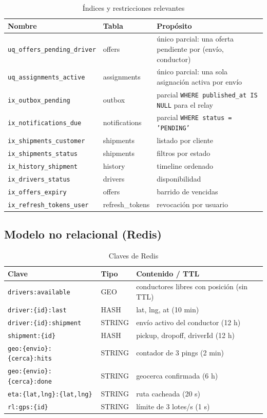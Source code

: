 \documentclass[conference]{IEEEtran}
\newcommand{\pkg}[1]{\texttt{#1}}
\begin{document}
\begin{table}[t]
\centering
\caption{Índices y restricciones relevantes}
\small
\begin{tabular}{@{}L{4.6cm}L{2.4cm}L{7.4cm}@{}}
\toprule
\textbf{Nombre} & \textbf{Tabla} & \textbf{Propósito}\\
\midrule
\pkg{uq\_offers\_pending\_driver} & offers & único parcial: una oferta pendiente por (envío, conductor)\\
\pkg{uq\_assignments\_active} & assignments & único parcial: una sola asignación activa por envío\\
\pkg{ix\_outbox\_pending} & outbox & parcial \pkg{WHERE published\_at IS NULL} para el relay\\
\pkg{ix\_notifications\_due} & notifications & parcial \pkg{WHERE status = 'PENDING'}\\
\pkg{ix\_shipments\_customer} & shipments & listado por cliente\\
\pkg{ix\_shipments\_status} & shipments & filtros por estado\\
\pkg{ix\_history\_shipment} & history & timeline ordenado\\
\pkg{ix\_drivers\_status} & drivers & disponibilidad\\
\pkg{ix\_offers\_expiry} & offers & barrido de vencidas\\
\pkg{ix\_refresh\_tokens\_user} & refresh\_tokens & revocación por usuario\\
\bottomrule
\end{tabular}
\end{table}

\subsection{Modelo no relacional (Redis)}

\begin{table}[t]
\centering
\caption{Claves de Redis}
\small
\begin{tabular}{@{}L{5.2cm}L{2cm}L{7.2cm}@{}}
\toprule
\textbf{Clave} & \textbf{Tipo} & \textbf{Contenido / TTL}\\
\midrule
\pkg{drivers:available} & GEO & conductores libres con posición (sin TTL)\\
\pkg{driver:\{id\}:last} & HASH & lat, lng, at (10 min)\\
\pkg{driver:\{id\}:shipment} & STRING & envío activo del conductor (12 h)\\
\pkg{shipment:\{id\}} & HASH & pickup, dropoff, driverId (12 h)\\
\pkg{geo:\{envio\}:\{cerca\}:hits} & STRING & contador de 3 pings (2 min)\\
\pkg{geo:\{envio\}:\{cerca\}:done} & STRING & geocerca confirmada (6 h)\\
\pkg{eta:\{lat,lng\}:\{lat,lng\}} & STRING & ruta cacheada (20 s)\\
\pkg{rl:gps:\{id\}} & STRING & límite de 3 lotes/s (1 s)\\
\bottomrule
\end{tabular}
\end{table}
\end{document}
